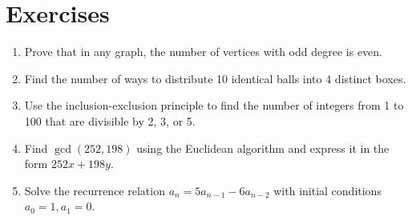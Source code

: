 \section{Exercises}

\begin{enumerate}
    \item Prove that in any graph, the number of vertices with odd degree is even.
    
    \item Find the number of ways to distribute 10 identical balls into 4 distinct boxes.
    
    \item Use the inclusion-exclusion principle to find the number of integers from 1 to 100 that are divisible by 2, 3, or 5.
    
    \item Find $\gcd(252, 198)$ using the Euclidean algorithm and express it in the form $252x + 198y$.
    
    \item Solve the recurrence relation $a_n = 5a_{n-1} - 6a_{n-2}$ with initial conditions $a_0 = 1, a_1 = 0$.
\end{enumerate}